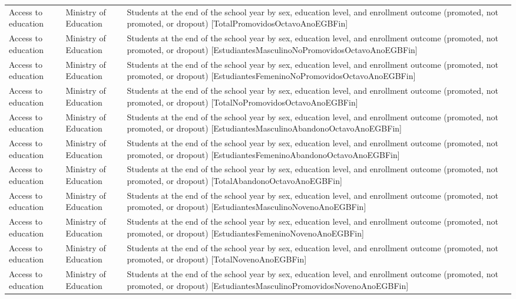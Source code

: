 \documentclass[10pt,a4paper]{article}
\begin{document}
\begin{longtable}{@{}>{\raggedright\arraybackslash}p{3.5cm}>{\raggedright\arraybackslash}p{5.6cm}>{\raggedright\arraybackslash}p{\dimexpr\textwidth-9.1cm-4\tabcolsep\relax}@{}}
Access to education & Ministry of Education & Students at the end of the school year by sex, education level, and enrollment outcome (promoted, not promoted, or dropout) [TotalPromovidosOctavoAnoEGBFin]\\
Access to education & Ministry of Education & Students at the end of the school year by sex, education level, and enrollment outcome (promoted, not promoted, or dropout) [EstudiantesMasculinoNoPromovidosOctavoAnoEGBFin]\\
Access to education & Ministry of Education & Students at the end of the school year by sex, education level, and enrollment outcome (promoted, not promoted, or dropout) [EstudiantesFemeninoNoPromovidosOctavoAnoEGBFin]\\
Access to education & Ministry of Education & Students at the end of the school year by sex, education level, and enrollment outcome (promoted, not promoted, or dropout) [TotalNoPromovidosOctavoAnoEGBFin]\\
Access to education & Ministry of Education & Students at the end of the school year by sex, education level, and enrollment outcome (promoted, not promoted, or dropout) [EstudiantesMasculinoAbandonoOctavoAnoEGBFin]\\
Access to education & Ministry of Education & Students at the end of the school year by sex, education level, and enrollment outcome (promoted, not promoted, or dropout) [EstudiantesFemeninoAbandonoOctavoAnoEGBFin]\\
Access to education & Ministry of Education & Students at the end of the school year by sex, education level, and enrollment outcome (promoted, not promoted, or dropout) [TotalAbandonoOctavoAnoEGBFin]\\
Access to education & Ministry of Education & Students at the end of the school year by sex, education level, and enrollment outcome (promoted, not promoted, or dropout) [EstudiantesMasculinoNovenoAnoEGBFin]\\
Access to education & Ministry of Education & Students at the end of the school year by sex, education level, and enrollment outcome (promoted, not promoted, or dropout) [EstudiantesFemeninoNovenoAnoEGBFin]\\
Access to education & Ministry of Education & Students at the end of the school year by sex, education level, and enrollment outcome (promoted, not promoted, or dropout) [TotalNovenoAnoEGBFin]\\
Access to education & Ministry of Education & Students at the end of the school year by sex, education level, and enrollment outcome (promoted, not promoted, or dropout) [EstudiantesMasculinoPromovidosNovenoAnoEGBFin]\\

\end{longtable}
\end{document}
